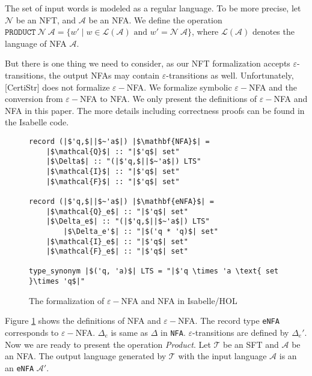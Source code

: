 \documentclass[a4paper,UKenglish,cleveref, autoref, thm-restate]{lipics-v2021}
\begin{document}
The set of input words is modeled as a regular language. To be more precise, let $\mathcal{N}$ be an NFT, and $\mathcal{A}$ be an NFA. We define the operation $\texttt{PRODUCT} ~\mathcal{N}~\mathcal{A} = \{w'\mid w\in \mathcal{L}(\mathcal{A})\text{ and } w' = \mathcal{N}~\mathcal{A}\}$, where $\mathcal{L}(\mathcal{A})$ denotes the language of NFA $\mathcal{A}$.


But there is one thing we need to consider, as our NFT formalization accepts $\varepsilon$-transitions, the output NFAs may contain $\varepsilon$-transitions as well. Unfortunately, [CertiStr] does not formalize $\varepsilon-$NFA. We formalize symbolic $\varepsilon-$NFA and the conversion from $\varepsilon-$NFA to NFA. We only present the definitions of $\varepsilon-$NFA and NFA in this paper. The more details including correctness proofs can be found in the Isabelle code. 

\begin{figure}[hbt!]
	\begin{lstlisting}
record (|$'q,$||$~'a$|) |$\mathbf{NFA}$| =
	|$\mathcal{Q}$| :: "|$'q$| set"
	|$\Delta$| :: "(|$'q,$||$~'a$|) LTS"
	|$\mathcal{I}$| :: "|$'q$| set"
	|$\mathcal{F}$| :: "|$'q$| set"

record (|$'q,$||$~'a$|) |$\mathbf{eNFA}$| =
	|$\mathcal{Q}_e$| :: "|$'q$| set"
	|$\Delta_e$| :: "(|$'q,$||$~'a$|) LTS"
        |$\Delta_e'$| :: "|$('q * 'q)$| set"
	|$\mathcal{I}_e$| :: "|$'q$| set"
	|$\mathcal{F}_e$| :: "|$'q$| set"

type_synonym |$('q, 'a)$| LTS = "|$'q \times 'a \text{ set }\times 'q$|"    
	\end{lstlisting}
\caption{The formalization of $\varepsilon-$NFA and NFA in Isabelle/HOL}
\label{fig-def-FAs}
\end{figure}

Figure \ref{fig-def-FAs} shows the definitions of NFA and $\varepsilon-$NFA.
The record type \texttt{eNFA} corresponds to $\varepsilon-$NFA. $\Delta_e$ is same as $\Delta$ in \texttt{NFA}. $\varepsilon$-transitions are defined by $\Delta_e'$.  Now we are ready to present the operation \emph{Product}. Let $\mathcal{T}$ be an SFT and  $\mathcal{A}$ be an NFA. The output language generated by $\mathcal{T}$ with the input language $\mathcal{A}$ is an an \texttt{eNFA} $\mathcal{A}'$. 
\end{document}
